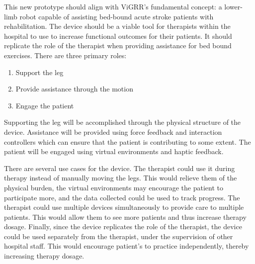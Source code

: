 \documentclass[12pt]{report}
\begin{document}
This new prototype should align with ViGRR's fundamental concept: a lower-limb robot capable of assisting bed-bound acute stroke patients with rehabilitation. The device should be a viable tool for therapists within the hospital to use to increase functional outcomes for their patients. It should replicate the role of the therapist when providing assistance for bed bound exercises. There are three primary roles:

\begin{enumerate}
	\item Support the leg 
	\item Provide assistance through the motion
	\item Engage the patient
\end{enumerate}

Supporting the leg will be accomplished through the physical structure of the device. Assistance will be provided using force feedback and interaction controllers which can ensure that the patient is contributing to some extent. The patient will be engaged using virtual environments and haptic feedback. 


 

There are several use cases for the device. The therapist could use it during therapy instead of manually moving the legs. This would relieve them of the physical burden, the virtual environments may encourage the patient to participate more, and the data collected could be used to track progress. The therapist could use multiple devices simultaneously to provide care to multiple patients. This would allow them to see more patients and thus increase therapy dosage. Finally, since the device replicates the role of the therapist, the device could be used separately from the therapist, under the supervision of other hospital staff. This would encourage patient's to practice independently, thereby increasing therapy dosage. 
\end{document}
